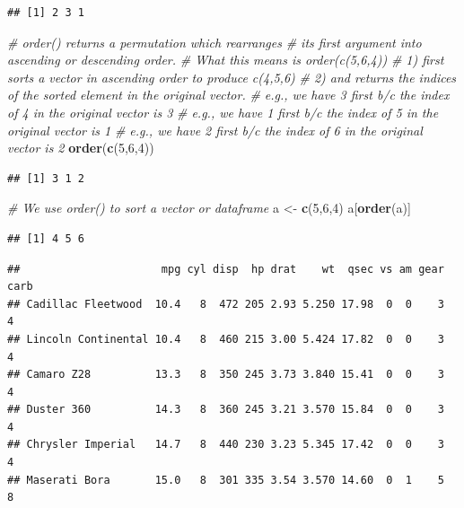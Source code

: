 \documentclass[]{book}
\newenvironment{Shaded}{\begin{snugshade}}{\end{snugshade}}
\newcommand{\KeywordTok}[1]{\textcolor[rgb]{0.13,0.29,0.53}{\textbf{{#1}}}}
\newcommand{\DecValTok}[1]{\textcolor[rgb]{0.00,0.00,0.81}{{#1}}}
\newcommand{\StringTok}[1]{\textcolor[rgb]{0.31,0.60,0.02}{{#1}}}
\newcommand{\CommentTok}[1]{\textcolor[rgb]{0.56,0.35,0.01}{\textit{{#1}}}}
\newcommand{\NormalTok}[1]{{#1}}
\begin{document}
\begin{verbatim}
## [1] 2 3 1
\end{verbatim}

\begin{Shaded}
\begin{Highlighting}[]
\CommentTok{# order() returns a permutation which rearranges }
\CommentTok{# its first argument into ascending or descending order. }
\CommentTok{# What this means is order(c(5,6,4)) }
\CommentTok{# 1) first sorts a vector in ascending order to produce c(4,5,6)}
\CommentTok{# 2) and returns the indices of the sorted element in the original vector. }
\CommentTok{# e.g., we have 3 first b/c the index of 4 in the original vector is 3}
\CommentTok{# e.g., we have 1 first b/c the index of 5 in the original vector is 1}
\CommentTok{# e.g., we have 2 first b/c the index of 6 in the original vector is 2}
\KeywordTok{order}\NormalTok{(}\KeywordTok{c}\NormalTok{(}\DecValTok{5}\NormalTok{,}\DecValTok{6}\NormalTok{,}\DecValTok{4}\NormalTok{))}
\end{Highlighting}
\end{Shaded}

\begin{verbatim}
## [1] 3 1 2
\end{verbatim}

\begin{Shaded}
\begin{Highlighting}[]
\CommentTok{# We use order() to sort a vector or dataframe}
\NormalTok{a <-}\StringTok{ }\KeywordTok{c}\NormalTok{(}\DecValTok{5}\NormalTok{,}\DecValTok{6}\NormalTok{,}\DecValTok{4}\NormalTok{)}
\NormalTok{a[}\KeywordTok{order}\NormalTok{(a)]}
\end{Highlighting}
\end{Shaded}

\begin{verbatim}
## [1] 4 5 6
\end{verbatim}

\begin{Shaded}
\end{Shaded}

\begin{verbatim}
##                      mpg cyl disp  hp drat    wt  qsec vs am gear carb
## Cadillac Fleetwood  10.4   8  472 205 2.93 5.250 17.98  0  0    3    4
## Lincoln Continental 10.4   8  460 215 3.00 5.424 17.82  0  0    3    4
## Camaro Z28          13.3   8  350 245 3.73 3.840 15.41  0  0    3    4
## Duster 360          14.3   8  360 245 3.21 3.570 15.84  0  0    3    4
## Chrysler Imperial   14.7   8  440 230 3.23 5.345 17.42  0  0    3    4
## Maserati Bora       15.0   8  301 335 3.54 3.570 14.60  0  1    5    8
\end{verbatim}
\end{document}
